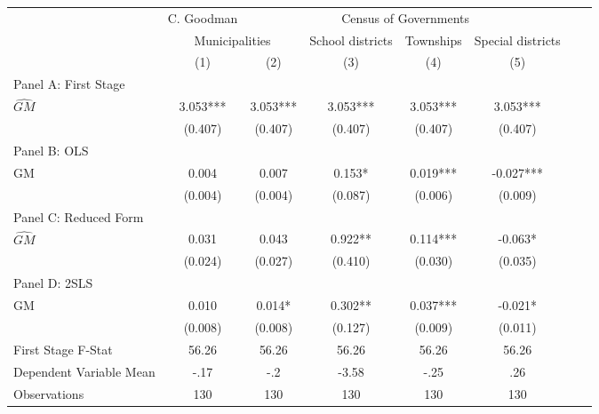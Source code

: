  \begin{tabular}{l*{7}{c}} \toprule
&\multicolumn{1}{c}{C. Goodman}&\multicolumn{4}{c}{Census of Governments}\\\cmidrule(lr){2-2}\cmidrule(lr){3-6}
&\multicolumn{2}{c}{Municipalities}&\multicolumn{1}{c}{School districts}&\multicolumn{1}{c}{Townships}&\multicolumn{1}{c}{Special districts}\\\cmidrule(lr){2-3}\cmidrule(lr){4-6}
&\multicolumn{1}{c}{(1)}&\multicolumn{1}{c}{(2)}&\multicolumn{1}{c}{(3)}&\multicolumn{1}{c}{(4)}&\multicolumn{1}{c}{(5)}\\
\cmidrule(lr){1-6}
\multicolumn{5}{l}{Panel A: First Stage}\\
\cmidrule(lr){1-6}
$\widehat{GM}$  &    3.053***&    3.053***&    3.053***&    3.053***&    3.053***\\
                &  (0.407)   &  (0.407)   &  (0.407)   &  (0.407)   &  (0.407)   \\
\cmidrule(lr){1-6}
\multicolumn{5}{l}{Panel B: OLS}\\
\cmidrule(lr){1-6}
GM              &    0.004   &    0.007   &    0.153*  &    0.019***&   -0.027***\\
                &  (0.004)   &  (0.004)   &  (0.087)   &  (0.006)   &  (0.009)   \\
\cmidrule(lr){1-6}
\multicolumn{5}{l}{Panel C: Reduced Form}\\
\cmidrule(lr){1-6}
$\widehat{GM}$  &    0.031   &    0.043   &    0.922** &    0.114***&   -0.063*  \\
                &  (0.024)   &  (0.027)   &  (0.410)   &  (0.030)   &  (0.035)   \\
\cmidrule(lr){1-6}
\multicolumn{5}{l}{Panel D: 2SLS}\\
\cmidrule(lr){1-6}
GM              &    0.010   &    0.014*  &    0.302** &    0.037***&   -0.021*  \\
                &  (0.008)   &  (0.008)   &  (0.127)   &  (0.009)   &  (0.011)   \\
\midrule
First Stage F-Stat&    56.26   &    56.26   &    56.26   &    56.26   &    56.26   \\
Dependent Variable Mean&     -.17   &      -.2   &    -3.58   &     -.25   &      .26   \\
Observations    &      130   &      130   &      130   &      130   &      130   \\
 \bottomrule \end{tabular}
